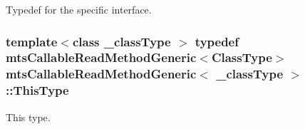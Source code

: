 Typedef for the specific interface. \hypertarget{classmts_callable_read_method_generic_a4fa11906c9156401ae37307545a10f80}{
\subsubsection[{This\-Type}]{\setlength{\rightskip}{0pt plus 5cm}template$<$class \-\_\-class\-Type $>$ typedef {\bf mts\-Callable\-Read\-Method\-Generic}$<${\bf Class\-Type}$>$ {\bf mts\-Callable\-Read\-Method\-Generic}$<$ \-\_\-class\-Type $>$\-::{\bf This\-Type}}}\label{classmts_callable_read_method_generic_a4fa11906c9156401ae37307545a10f80}
This type. 

